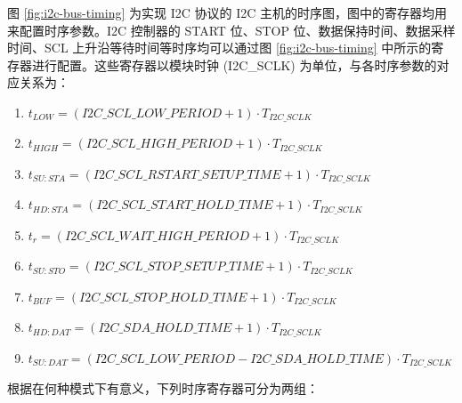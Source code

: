 \documentclass[main\_\_CN.tex]{subfiles}
\begin{document}
图 \ref{fig:i2c-bus-timing} 为实现 I2C 协议的 I2C 主机的时序图，图中的寄存器均用来配置时序参数。I2C 控制器的 START 位、STOP 位、数据保持时间、数据采样时间、SCL 上升沿等待时间等时序均可以通过图 \ref{fig:i2c-bus-timing} 中所示的寄存器进行配置。这些寄存器以模块时钟 (I2C\_SCLK)  为单位，与各时序参数的对应关系为：

\begin{enumerate}
\item  $t_{LOW} = (\hyperref[fielddesc:I2CSCLLOWPERIOD]{I2C\_SCL\_LOW\_PERIOD} + 1) \cdot  T_{I2C\_SCLK}$

\item  $t_{HIGH} = (\hyperref[fielddesc:I2CSCLHIGHPERIOD]{I2C\_SCL\_HIGH\_PERIOD} + 1) \cdot  T_{I2C\_SCLK}$

\item  $t_{SU:STA} = (\hyperref[fielddesc:I2CSCLRSTARTSETUPTIME]{I2C\_SCL\_RSTART\_SETUP\_TIME} + 1) \cdot  T_{I2C\_SCLK}$

\item  $t_{HD:STA} = (\hyperref[fielddesc:I2CSCLSTARTHOLDTIME]{I2C\_SCL\_START\_HOLD\_TIME} +1) \cdot  T_{I2C\_SCLK}$

\item  $t_{r} = (\hyperref[fielddesc:I2CSCLWAITHIGHPERIOD]{I2C\_SCL\_WAIT\_HIGH\_PERIOD} + 1 ) \cdot  T_{I2C\_SCLK}$

\item  $t_{SU:STO} = (\hyperref[fielddesc:I2CSCLSTOPSETUPTIME]{I2C\_SCL\_STOP\_SETUP\_TIME}  + 1) \cdot  T_{I2C\_SCLK}$

\item  $t_{BUF} = (\hyperref[fielddesc:I2CSCLSTOPHOLDTIME]{I2C\_SCL\_STOP\_HOLD\_TIME}  + 1) \cdot  T_{I2C\_SCLK}$

\item  $t_{HD:DAT} = (\hyperref[fielddesc:I2CSDAHOLDTIME]{I2C\_SDA\_HOLD\_TIME} +1) \cdot  T_{I2C\_SCLK}$

\item  $t_{SU:DAT} = (\hyperref[fielddesc:I2CSCLLOWPERIOD]{I2C\_SCL\_LOW\_PERIOD} - \hyperref[fielddesc:I2CSDAHOLDTIME]{I2C\_SDA\_HOLD\_TIME}) \cdot  T_{I2C\_SCLK}$
\end{enumerate}

根据在何种模式下有意义，下列时序寄存器可分为两组：
\end{document}
